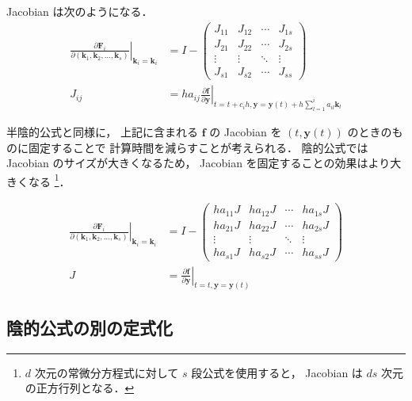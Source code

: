 Jacobian は次のようになる．
\begin{align}
    \left. \frac{\partial \bm{F}_i}{\partial (\bm{k}_1, \bm{k}_2, \ldots, \bm{k}_s)}
    \right|_{\bm{k}_i = \bm{k}_i}
           & = I -
    \begin{pmatrix}
        J_{11} & J_{12} & \cdots & J_{1s} \\
        J_{21} & J_{22} & \cdots & J_{2s} \\
        \vdots & \vdots & \ddots & \vdots \\
        J_{s1} & J_{s2} & \cdots & J_{ss}
    \end{pmatrix}
    \\
    J_{ij} & = h a_{ij} \left. \frac{\partial \bm{f}}{\partial \bm{y}}
    \right|_{t = t + c_i h, \bm{y} = \bm{y}(t) + h \sum_{l = 1}^i a_{il} \bm{k}_l}
\end{align}

半陰的公式と同様に，
上記に含まれる $\bm{f}$ の Jacobian を $(t, \bm{y}(t))$ のときのものに固定することで
計算時間を減らすことが考えられる．
陰的公式では Jacobian のサイズが大きくなるため，
Jacobian を固定することの効果はより大きくなる
\footnote{$d$ 次元の常微分方程式に対して $s$ 段公式を使用すると，%
    Jacobian は $ds$ 次元の正方行列となる．}．

\begin{align}
    \left. \frac{\partial \bm{F}_i}{\partial (\bm{k}_1, \bm{k}_2, \ldots, \bm{k}_s)}
    \right|_{\bm{k}_i = \bm{k}_i}
      & = I -
    \begin{pmatrix}
        h a_{11} J & h a_{12} J & \cdots & h a_{1s} J \\
        h a_{21} J & h a_{22} J & \cdots & h a_{2s} J \\
        \vdots     & \vdots     & \ddots & \vdots     \\
        h a_{s1} J & h a_{s2} J & \cdots & h a_{ss} J
    \end{pmatrix}
    \label{eq:ode_runge-kutta_implicit-jacobian-fixed}
    \\
    J & = \left. \frac{\partial \bm{f}}{\partial \bm{y}}
    \right|_{t = t, \bm{y} = \bm{y}(t)}
\end{align}

\subsection{陰的公式の別の定式化}\label{sec:ode_runge-kutta_another-implicit-stage-solving}

